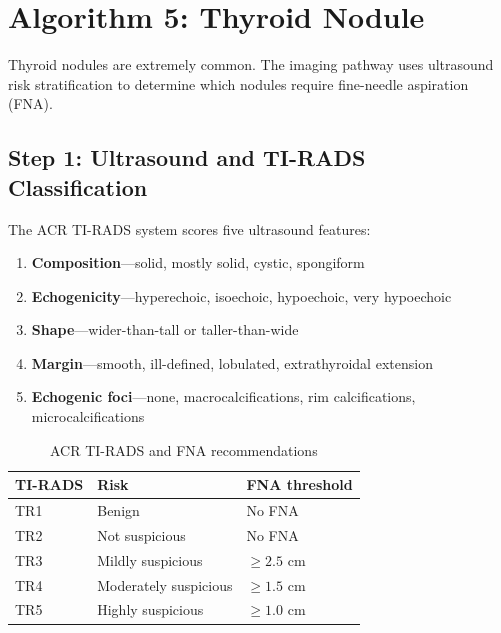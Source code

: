 \clearpage

\section{Algorithm 5: Thyroid Nodule}

Thyroid nodules are extremely common. The imaging pathway uses ultrasound risk stratification to determine which nodules require fine-needle aspiration (FNA).

\subsection{Step 1: Ultrasound and TI-RADS Classification}
The ACR TI-RADS system scores five ultrasound features:
\begin{enumerate}
    \item \textbf{Composition}---solid, mostly solid, cystic, spongiform
    \item \textbf{Echogenicity}---hyperechoic, isoechoic, hypoechoic, very hypoechoic
    \item \textbf{Shape}---wider-than-tall or taller-than-wide
    \item \textbf{Margin}---smooth, ill-defined, lobulated, extrathyroidal extension
    \item \textbf{Echogenic foci}---none, macrocalcifications, rim calcifications, microcalcifications
\end{enumerate}

\begin{table}[h]
\centering
\caption{ACR TI-RADS and FNA recommendations}
\begin{tabular}{|l|l|l|}
\hline
\textbf{TI-RADS} & \textbf{Risk} & \textbf{FNA threshold} \\
\hline
TR1 & Benign & No FNA \\
\hline
TR2 & Not suspicious & No FNA \\
\hline
TR3 & Mildly suspicious & $\geq 2.5$ cm \\
\hline
TR4 & Moderately suspicious & $\geq 1.5$ cm \\
\hline
TR5 & Highly suspicious & $\geq 1.0$ cm \\
\hline
\end{tabular}
\end{table}

